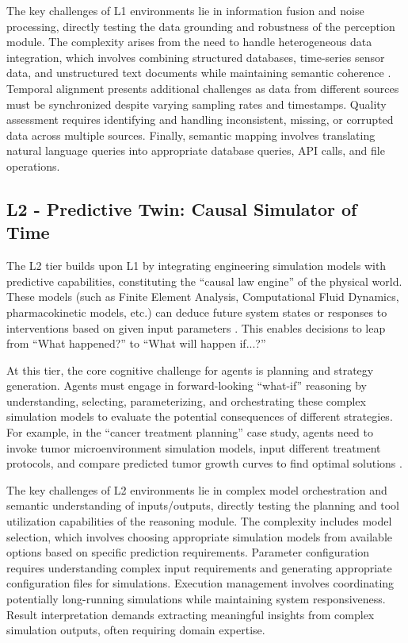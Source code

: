 The key challenges of L1 environments lie in information fusion and noise processing, directly testing the data grounding and robustness of the perception module. The complexity arises from the need to handle heterogeneous data integration, which involves combining structured databases, time-series sensor data, and unstructured text documents while maintaining semantic coherence \cite{lu2020digital}. Temporal alignment presents additional challenges as data from different sources must be synchronized despite varying sampling rates and timestamps. Quality assessment requires identifying and handling inconsistent, missing, or corrupted data across multiple sources. Finally, semantic mapping involves translating natural language queries into appropriate database queries, API calls, and file operations.

\subsection{L2 - Predictive Twin: Causal Simulator of Time}

The L2 tier builds upon L1 by integrating engineering simulation models with predictive capabilities, constituting the ``causal law engine'' of the physical world. These models (such as Finite Element Analysis, Computational Fluid Dynamics, pharmacokinetic models, etc.) can deduce future system states or responses to interventions based on given input parameters \cite{rasheed2020digital, fuller2020digital}. This enables decisions to leap from ``What happened?'' to ``What will happen if...?''

At this tier, the core cognitive challenge for agents is planning and strategy generation. Agents must engage in forward-looking ``what-if'' reasoning by understanding, selecting, parameterizing, and orchestrating these complex simulation models to evaluate the potential consequences of different strategies. For example, in the ``cancer treatment planning'' case study, agents need to invoke tumor microenvironment simulation models, input different treatment protocols, and compare predicted tumor growth curves to find optimal solutions \cite{rasheed2020digital}.

The key challenges of L2 environments lie in complex model orchestration and semantic understanding of inputs/outputs, directly testing the planning and tool utilization capabilities of the reasoning module. The complexity includes model selection, which involves choosing appropriate simulation models from available options based on specific prediction requirements. Parameter configuration requires understanding complex input requirements and generating appropriate configuration files for simulations. Execution management involves coordinating potentially long-running simulations while maintaining system responsiveness. Result interpretation demands extracting meaningful insights from complex simulation outputs, often requiring domain expertise.

